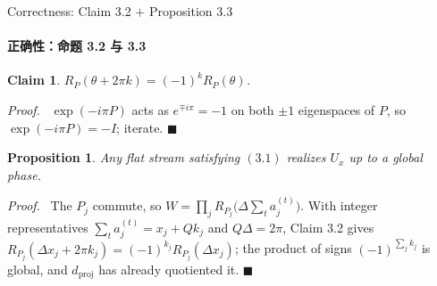 \documentclass[aspectratio=169,10pt]{beamer}
\newif\ifzh \zhfalse
\newcommand{\bl}[2]{\ifzh #2\else #1\fi}
\newtheorem{claim}{Claim}
\newtheorem{prop2}{Proposition}
\theoremstyle{definition}
\newenvironment{prf}[1][Proof]%
  {\par\smallskip\noindent\textit{#1.}\ \ignorespaces}%
  {\hfill$\blacksquare$\par\smallskip}
\newcommand{\dproj}{d_{\mathrm{proj}}}
\newcommand{\zhsub}[1]{\ifzh\else\framesubtitle{#1}\fi}
\begin{document}
\begin{frame}{\bl{Correctness: Claim 3.2 $+$ Proposition 3.3}%
                {正确性：命题 3.2 与 3.3}}
  \zhsub{正确性：命题 3.2 与 3.3}
  \small
  \begin{claim}
    $R_P(\theta+2\pi k)=(-1)^kR_P(\theta)$.
  \end{claim}
  \begin{prf}\footnotesize
    $\exp(-i\pi P)$ acts as $e^{\mp i\pi}=-1$ on both $\pm1$ eigenspaces of
    $P$, so $\exp(-i\pi P)=-I$; iterate.
  \end{prf}
  \pause
  \begin{prop2}
    Any flat stream satisfying $(3.1)$ realizes $U_x$ up to a global phase.
  \end{prop2}
  \begin{prf}\footnotesize
    The $P_j$ commute, so
    $W=\prod_jR_{P_j}\big(\Delta\sum_ta_j^{(t)}\big)$. With integer
    representatives $\sum_ta_j^{(t)}=x_j+Qk_j$ and $Q\Delta=2\pi$, Claim 3.2
    gives $R_{P_j}(\Delta x_j+2\pi k_j)=(-1)^{k_j}R_{P_j}(\Delta x_j)$; the
    product of signs $(-1)^{\sum_jk_j}$ is global, and $\dproj$ has already
    quotiented it.
  \end{prf}
\end{frame}
\end{document}
